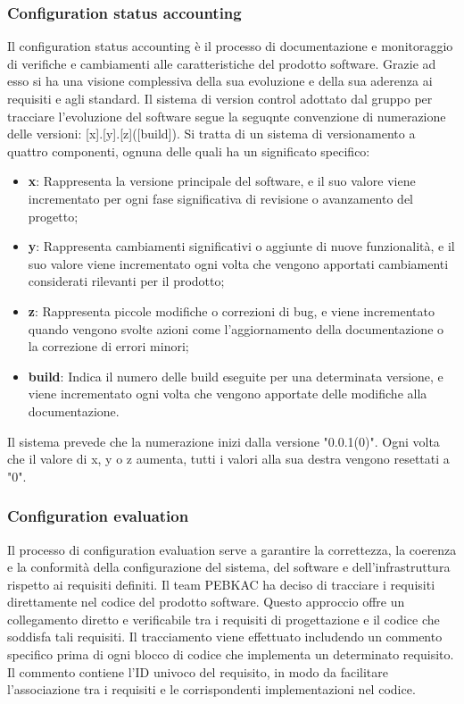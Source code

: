 \subsubsection{Configuration status accounting}
Il configuration status accounting è il processo di documentazione e monitoraggio di verifiche e cambiamenti alle caratteristiche del prodotto software. Grazie ad esso si ha una visione complessiva della sua evoluzione e della sua aderenza ai requisiti e agli standard.
Il sistema di version control adottato dal gruppo per tracciare l'evoluzione del software segue la seguqnte convenzione di numerazione delle versioni: [x].[y].[z]([build]). Si tratta di un sistema di versionamento a quattro componenti, ognuna delle quali ha un significato specifico:
\begin{itemize}
    \item \textbf{x}: Rappresenta la versione principale del software, e il suo valore viene incrementato per ogni fase significativa di revisione o avanzamento del progetto;
    \item \textbf{y}: Rappresenta cambiamenti significativi o aggiunte di nuove funzionalità, e il suo valore viene incrementato ogni volta che vengono apportati cambiamenti considerati rilevanti per il prodotto;
    \item \textbf{z}: Rappresenta piccole modifiche o correzioni di bug, e viene incrementato quando vengono svolte azioni come l'aggiornamento della documentazione o la correzione di errori minori;
    \item \textbf{build}: Indica il numero delle build eseguite per una determinata versione, e viene incrementato ogni volta che vengono apportate delle modifiche alla documentazione.
\end{itemize}
Il sistema prevede che la numerazione inizi dalla versione "0.0.1(0)". Ogni volta che il valore di x, y o z aumenta, tutti i valori alla sua destra vengono resettati a "0".
\subsubsection{Configuration evaluation}
Il processo di configuration evaluation serve a garantire la correttezza, la coerenza e la conformità della configurazione del sistema, del software e dell'infrastruttura rispetto ai requisiti definiti.
Il team PEBKAC ha deciso di tracciare i requisiti direttamente nel codice del prodotto software. Questo approccio offre un collegamento diretto e verificabile tra i requisiti di progettazione e il codice che soddisfa tali requisiti. Il tracciamento viene effettuato includendo un commento specifico prima di ogni blocco di codice che implementa un determinato requisito. Il commento contiene l'ID univoco del requisito, in modo da facilitare l'associazione tra i requisiti e le corrispondenti implementazioni nel codice.
